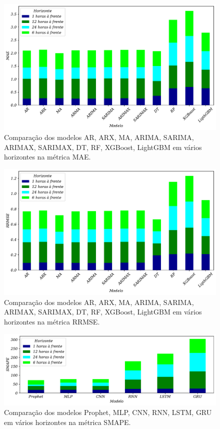 \begin{figure}[H]
	\centering
	\caption{Comparação dos modelos AR, ARX, MA, ARIMA, SARIMA, ARIMAX, SARIMAX, DT, RF, XGBoost, LightGBM em vários horizontes na métrica MAE.}\label{fig:modelos-arima}
	\includegraphics[width=0.7\linewidth]{Resultados/Figuras/mae_comparar_basic}
	
	
\end{figure}

\begin{figure}[H]
	\centering
	\caption{Comparação dos modelos AR, ARX, MA, ARIMA, SARIMA, ARIMAX, SARIMAX, DT, RF, XGBoost, LightGBM em vários horizontes na métrica RRMSE.}\label{fig:modelos-arima2}
	\includegraphics[width=0.7\linewidth]{Resultados/Figuras/rrmse_comparar_basic}
	
	
\end{figure}

\begin{figure}[H]
	\centering
	\caption{Comparação dos modelos Prophet, MLP, CNN, RNN, LSTM, GRU em vários horizontes na métrica SMAPE.}\label{fig:modelos-red1}
	\includegraphics[width=0.9\linewidth]{Resultados/Figuras/smape_comparar}
	
	
\end{figure}



